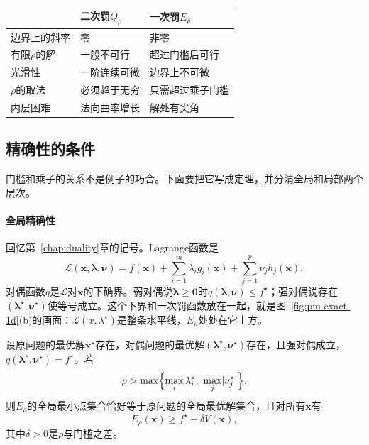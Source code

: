 \begin{BookInlineTable}
  \centering
  \begin{tabular}{@{}lll@{}}
    \toprule
     & 二次罚$Q_\rho$ & 一次罚$E_\rho$\\
    \midrule
    边界上的斜率 & 零 & 非零\\
    有限$\rho$的解 & 一般不可行 & 超过门槛后可行\\
    光滑性 & 一阶连续可微 & 边界上不可微\\
    $\rho$的取法 & 必须趋于无穷 & 只需超过乘子门槛\\
    内层困难 & 法向曲率增长 & 解处有尖角\\
    \bottomrule
  \end{tabular}
  \caption{二次罚与一次罚的对照。二次罚以病态换取光滑，一次罚以不可微换取有限的罚参数。}
  \label{tab:pm-penalty-contrast}
\end{BookInlineTable}

\subsection{精确性的条件}
\label{sec:pm-exact-conditions}

门槛和乘子的关系不是例子的巧合。下面要把它写成定理，并分清全局和局部两个层次。

\paragraph{全局精确性}
回忆第~\ref{chap:duality}章的记号。Lagrange函数是
\[
 \mathcal{L}(\bm{x},\bm{\lambda},\bm{\nu})=f(\bm{x})+\sum_{i=1}^m\lambda_ig_i(\bm{x})+\sum_{j=1}^p\nu_jh_j(\bm{x}),
\]
对偶函数$q$是$\mathcal{L}$对$\bm{x}$的下确界。弱对偶说$\bm{\lambda}\geq\bm{0}$时$q(\bm{\lambda},\bm{\nu})\leq f^\star$；强对偶说存在$(\bm{\lambda}^\star,\bm{\nu}^\star)$使等号成立。这个下界和一次罚函数放在一起，就是图~\ref{fig:pm-exact-1d}(b)的画面：$\mathcal{L}(x,\lambda^\star)$是整条水平线，$E_\rho$处处在它上方。

\begin{theorem}[一次罚的全局精确性]
\label{thm:pm-exact-global}
设原问题的最优解$\bm{x}^\star$存在，对偶问题的最优解$(\bm{\lambda}^\star,\bm{\nu}^\star)$存在，且强对偶成立，$q(\bm{\lambda}^\star,\bm{\nu}^\star)=f^\star$。若
\begin{equation}
 \rho>\max\Bigl\{\max_i\lambda_i^\star,\ \max_j\lvert\nu_j^\star\rvert\Bigr\},
 \label{eq:pm-exact-threshold}
\end{equation}
则$E_\rho$的全局最小点集合恰好等于原问题的全局最优解集合，且对所有$\bm{x}$有
\begin{equation}
 E_\rho(\bm{x})\geq f^\star+\delta V(\bm{x}),
 \label{eq:pm-exact-lower-bound}
\end{equation}
其中$\delta>0$是$\rho$与门槛之差。
\end{theorem}

